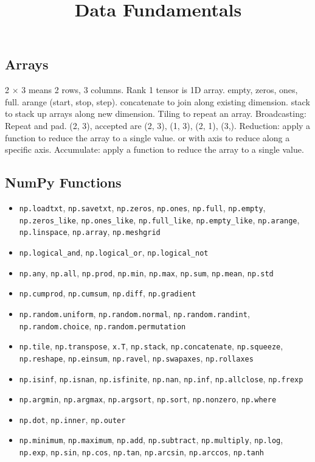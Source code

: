 \documentclass{article}
\title{Data Fundamentals}
\author{}
\date{}
\begin{document}
\small

\subsection*{Arrays}

2 $\times$ 3 means 2 rows, 3 columns.
Rank 1 tensor is 1D array.
empty, zeros, ones, full.
arange (start, stop, step).
concatenate to join along existing dimension.
stack to stack up arrays along new dimension.
Tiling to repeat an array.
Broadcasting:
Repeat and pad.
(2, 3), accepted are (2, 3), (1, 3), (2, 1), (3,).
Reduction: apply a function to reduce the array to a single value.
or with axis to reduce along a specific axis.
Accumulate: apply a function to reduce the array to a single value.

\subsection*{NumPy Functions}
\begin{itemize}
    \item \texttt{np.loadtxt}, \texttt{np.savetxt}, \texttt{np.zeros}, \texttt{np.ones}, \texttt{np.full}, \texttt{np.empty}, \texttt{np.zeros\_like}, \texttt{np.ones\_like}, \texttt{np.full\_like}, \texttt{np.empty\_like}, \texttt{np.arange}, \texttt{np.linspace}, \texttt{np.array}, \texttt{np.meshgrid}
    \item \texttt{np.logical\_and}, \texttt{np.logical\_or}, \texttt{np.logical\_not}
    \item \texttt{np.any}, \texttt{np.all}, \texttt{np.prod}, \texttt{np.min}, \texttt{np.max}, \texttt{np.sum}, \texttt{np.mean}, \texttt{np.std}
    \item \texttt{np.cumprod}, \texttt{np.cumsum}, \texttt{np.diff}, \texttt{np.gradient}
    \item \texttt{np.random.uniform}, \texttt{np.random.normal}, \texttt{np.random.randint}, \texttt{np.random.choice}, \texttt{np.random.permutation}
    \item \texttt{np.tile}, \texttt{np.transpose}, \texttt{x.T}, \texttt{np.stack}, \texttt{np.concatenate}, \texttt{np.squeeze}, \texttt{np.reshape}, \texttt{np.einsum}, \texttt{np.ravel}, \texttt{np.swapaxes}, \texttt{np.rollaxes}
    \item \texttt{np.isinf}, \texttt{np.isnan}, \texttt{np.isfinite}, \texttt{np.nan}, \texttt{np.inf}, \texttt{np.allclose}, \texttt{np.frexp}
    \item \texttt{np.argmin}, \texttt{np.argmax}, \texttt{np.argsort}, \texttt{np.sort}, \texttt{np.nonzero}, \texttt{np.where}
    \item \texttt{np.dot}, \texttt{np.inner}, \texttt{np.outer}
    \item \texttt{np.minimum}, \texttt{np.maximum}, \texttt{np.add}, \texttt{np.subtract}, \texttt{np.multiply}, \texttt{np.log}, \texttt{np.exp}, \texttt{np.sin}, \texttt{np.cos}, \texttt{np.tan}, \texttt{np.arcsin}, \texttt{np.arccos}, \texttt{np.tanh}
\end{itemize}
\end{document}
